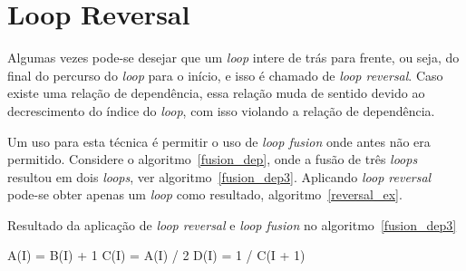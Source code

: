 \section{Loop Reversal}

Algumas vezes pode-se desejar que um \textit{loop} intere de trás para frente,
ou seja, do final do percurso do \textit{loop} para o início, e isso é chamado
de \textit{loop reversal}.
Caso existe uma relação de dependência, essa relação muda de sentido devido ao
decrescimento do índice do \textit{loop}, com isso violando a relação de 
dependência.

Um uso para esta técnica é permitir o uso de \textit{loop fusion} onde antes não
era permitido. 
Considere o algoritmo~\ref{fusion_dep}, onde a fusão de três \textit{loops}
resultou em dois \textit{loops}, ver algoritmo~\ref{fusion_dep3}. 
Aplicando \textit{loop reversal} pode-se obter apenas um \textit{loop} como
resultado, algoritmo~\ref{reversal_ex}.

\begin{algorithm}
\caption{Resultado da aplicação de \textit{loop reversal} e \textit{loop fusion}
no algoritmo~\ref{fusion_dep3}}
\label{reversal_ex}
\begin{algorithmic}[1]

\STATE A(I) = B(I) + 1
\STATE C(I) = A(I) / 2
\STATE D(I) = 1 / C(I + 1)
\ENDFOR

\end{algorithmic}
\end{algorithm}

